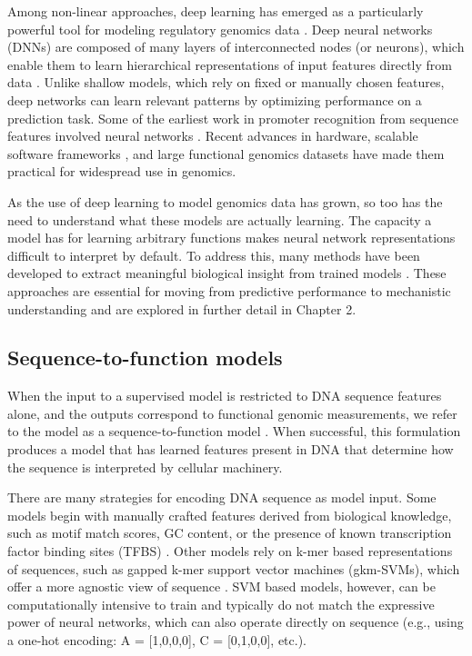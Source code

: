 \begin{dissertationintroduction}
Among non-linear approaches, deep learning has emerged as a particularly powerful tool for modeling regulatory genomics data \cite{Eraslan2019-ye}. Deep neural networks (DNNs) are composed of many layers of interconnected nodes (or neurons), which enable them to learn hierarchical representations of input features directly from data \cite{LeCun2015-fx}. Unlike shallow models, which rely on fixed or manually chosen features, deep networks can learn relevant patterns by optimizing performance on a prediction task. Some of the earliest work in promoter recognition from sequence features involved neural networks \cite{Lukashin1989-wi,O-Neill1991-dh}. Recent advances in hardware, scalable software frameworks \cite{Paszke2019-fm}, and large functional genomics datasets have made them practical for widespread use in genomics.

As the use of deep learning to model genomics data has grown, so too has the need to understand what these models are actually learning. The capacity a model has for learning arbitrary functions makes neural network representations difficult to interpret by default. To address this, many methods have been developed to extract meaningful biological insight from trained models \cite{Novakovsky2022-ft,Shrikumar2017-og,Lundberg2017-hh,Talukder2021-wj,Koo2020-vz}. These approaches are essential for moving from predictive performance to mechanistic understanding and are explored in further detail in Chapter 2.

\subsection{Sequence-to-function models}

When the input to a supervised model is restricted to DNA sequence features alone, and the outputs correspond to functional genomic measurements, we refer to the model as a sequence-to-function model \cite{Sasse2024-ly}. When successful, this formulation produces a model that has learned features present in DNA that determine how the sequence is interpreted by cellular machinery.

There are many strategies for encoding DNA sequence as model input. Some models begin with manually crafted features derived from biological knowledge, such as motif match scores, GC content, or the presence of known transcription factor binding sites (TFBS) \cite{De_Boer2020-mw}. Other models rely on k-mer based representations of sequences, such as gapped k-mer support vector machines (gkm-SVMs), which offer a more agnostic view of sequence \cite{Ghandi2014-hn}. SVM based models, however, can be computationally intensive to train and typically do not match the expressive power of neural networks, which can also operate directly on sequence (e.g., using a one-hot encoding: A = [1,0,0,0], C = [0,1,0,0], etc.). 


\end{dissertationintroduction}
